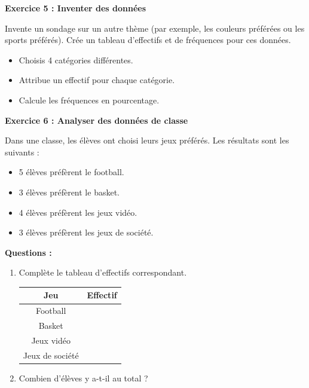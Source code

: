 \documentclass{article}
\begin{document}
\begin{tcolorbox}[colback=green!10!white, colframe=yellow!75!black, title=\textcolor{white}{Exercices}]

\textbf{Exercice 5 : Inventer des données}

Invente un sondage sur un autre thème (par exemple, les couleurs préférées ou les sports préférés). Crée un tableau d'effectifs et de fréquences pour ces données.
\begin{itemize}
    \item Choisis 4 catégories différentes.
    \item Attribue un effectif pour chaque catégorie.
    \item Calcule les fréquences en pourcentage.
\end{itemize}

\vspace{0.35cm}

\textbf{Exercice 6 : Analyser des données de classe}

Dans une classe, les élèves ont choisi leurs jeux préférés. Les résultats sont les suivants :
\begin{itemize}
    \item 5 élèves préfèrent le football.
    \item 3 élèves préfèrent le basket.
    \item 4 élèves préfèrent les jeux vidéo.
    \item 3 élèves préfèrent les jeux de société.
\end{itemize}

\textbf{Questions :}
\begin{enumerate}
    \item Complète le tableau d'effectifs correspondant.
    
\begin{center}
\begin{tabular}{|c|c|}
\hline
Jeu & Effectif \\
\hline
Football &  \\
Basket &  \\
Jeux vidéo &  \\
Jeux de société &  \\
\hline
\end{tabular}
\end{center}

    \item Combien d'élèves y a-t-il au total ?
\end{enumerate}


\end{tcolorbox}
\end{document}
